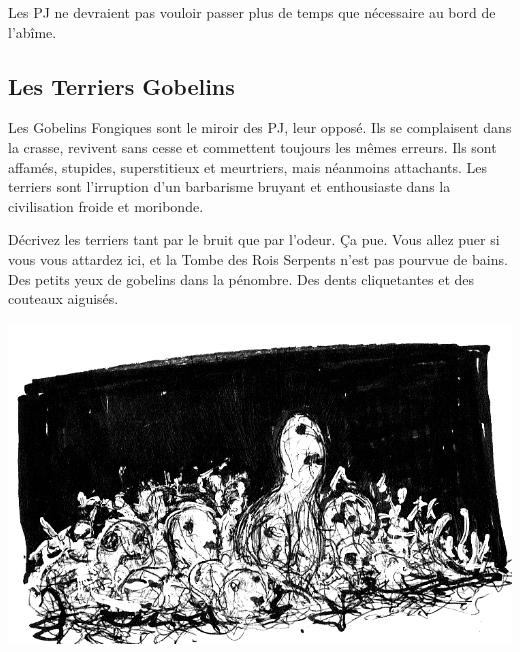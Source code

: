 Les PJ ne devraient pas vouloir passer plus de temps que nécessaire au bord de l'abîme.

\subsection{Les Terriers Gobelins}
Les Gobelins Fongiques sont le miroir des PJ, leur opposé.
Ils se complaisent dans la crasse, revivent sans cesse et commettent toujours les mêmes erreurs.
Ils sont affamés, stupides, superstitieux et meurtriers, mais néanmoins attachants.
Les terriers sont l'irruption d'un barbarisme bruyant et enthousiaste dans la civilisation froide et moribonde.

Décrivez les terriers tant par le bruit que par l'odeur.
Ça pue.
Vous allez puer si vous vous attardez ici, et la Tombe des Rois Serpents n'est pas pourvue de bains.
Des petits yeux de gobelins dans la pénombre.
Des dents cliquetantes et des couteaux aiguisés.

\includegraphics[width=\columnwidth]{pics/goblin_pit.jpg}
